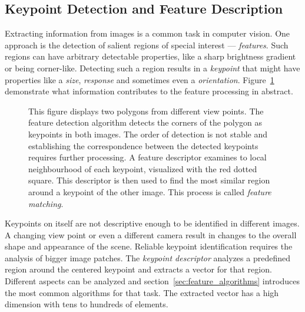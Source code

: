 \subsection{Keypoint Detection and Feature Description}

Extracting information from images is a common task in computer vision.
One approach is the detection of salient regions of special interest --- \emph{features}.
Such regions can have arbitrary detectable properties, like a sharp brightness gradient or being corner-like.
Detecting such a region results in a \emph{keypoint} that might have properties like a \emph{size}, \emph{response} and sometimes even a \emph{orientation}.
Figure~\ref{fig:features_example} demonstrate what information contributes to the feature processing in abstract.
\begin{figure}[H]
    \scalebox{0.95}{%
    
    }
    \caption[Feature detection identifies salient parts of an image and allows tracking those over multiple images.]{This figure displays two polygons from different view points. The feature detection algorithm detects the corners of the polygon as keypoints in both images. The order of detection is not stable and establishing the correspondence between the detected keypoints requires further processing. A feature descriptor examines to local neighbourhood of each keypoint, visualized with the red dotted square. This descriptor is then used to find the most similar region around a keypoint of the other image. This process is called \emph{feature matching}.}\label{fig:features_example}
\end{figure}
Keypoints on itself are not descriptive enough to be identified in different images.
A changing view point or even a different camera result in changes to the overall shape and appearance of the scene.
Reliable keypoint identification requires the analysis of bigger image patches.
The \emph{keypoint descriptor} analyzes a predefined region around the centered keypoint and extracts a vector for that region.
Different aspects can be analyzed and section~\ref{sec:feature_algorithms} introduces the most common algorithms for that task.
The extracted vector has a high dimension with tens to hundreds of elements.

